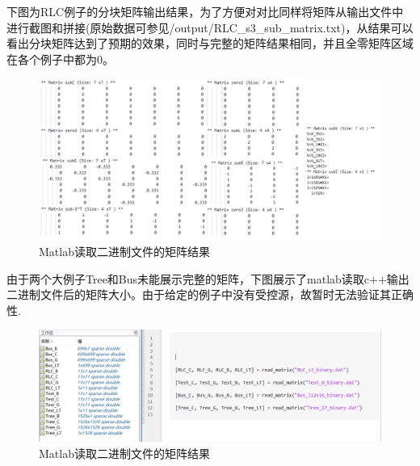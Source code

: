 \documentclass[12pt]{article}
\begin{document}
\qquad 下图为RLC例子的分块矩阵输出结果，为了方便对对比同样将矩阵从输出文件中进行截图和拼接(原始数据可参见/output/RLC\_s3\_sub\_matrix.txt)，从结果可以看出分块矩阵达到了预期的效果，同时与完整的矩阵结果相同，并且全零矩阵区域在各个例子中都为0。\par
\begin{figure}[H]
  \centering
  \includegraphics[width=15cm]{figure/RLC_sub.png}
  \caption{Matlab读取二进制文件的矩阵结果}
\end{figure}

\qquad 由于两个大例子Tree和Bus未能展示完整的矩阵，下图展示了matlab读取c++输出二进制文件后的矩阵大小。由于给定的例子中没有受控源，故暂时无法验证其正确性.\par 

\begin{figure}[H]
  \centering
  \includegraphics[width=15cm]{figure/all_matrix.png}
  \caption{Matlab读取二进制文件的矩阵结果}
\end{figure}
\end{document}
